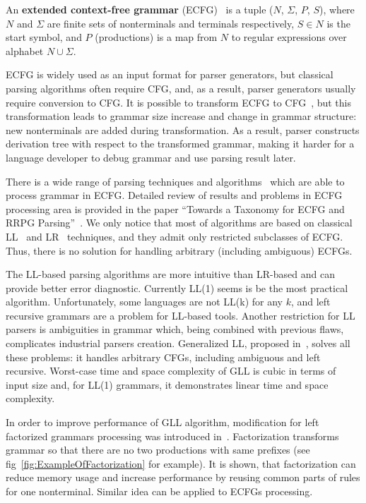 \documentclass[runningheads,a4paper]{llncs}
\begin{document}
\begin{mydef}
An \textbf{extended context-free grammar} (ECFG)~\cite{ECFG} is a tuple ($N$, $\Sigma$, $P$, $S$), where $N$
and $\Sigma$ are finite sets of nonterminals and terminals respectively, $ S\in N$ is the start symbol,
and $P$ (productions) is a map from $N$ to regular expressions over alphabet $N \cup \Sigma$.
\end{mydef}

ECFG is widely used as an input format for parser generators, but classical parsing algorithms often require CFG, and, as a result, parser generators usually require conversion to CFG.
It is possible to transform ECFG to CFG~\cite{ELL}, but this transformation leads to grammar size 
increase and change in grammar structure: new nonterminals are added during transformation.
As a result, parser constructs derivation tree with respect to the transformed grammar, making it harder for a language developer to debug grammar and use parsing result later.

There is a wide range of parsing techniques and algorithms~\cite{AttributedELL,ELRR,ECFGparsing,ELLParser,ELL,ECFG,ELALR,ELRParsing} which are able to process grammar in ECFG.
Detailed review of results and problems in ECFG processing area is provided in the paper ``Towards a Taxonomy for ECFG and RRPG Parsing''~\cite{ECFG}. 
We only notice that most of algorithms are based on classical LL~\cite{ELLParser,AttributedELL,PredictiveECFG} and LR~\cite{ELRParsing,ELALR,ELRR} techniques, and they admit only restricted subclasses of ECFG.
Thus, there is no solution for handling arbitrary (including ambiguous) ECFGs.

The LL-based parsing algorithms are more intuitive than LR-based and can provide better error diagnostic.
Currently LL(1) seems is be the most practical algorithm.
Unfortunately, some languages are not LL(k) for any $k$, and left recursive grammars are a problem for LL-based tools.
Another restriction for LL parsers is ambiguities in grammar which, being combined with previous flaws, complicates industrial parsers creation.
Generalized LL, proposed in~\cite{scott2010gll}, solves all these problems: it handles arbitrary CFGs, including ambiguous and left recursive.  
Worst-case time and space complexity of GLL is cubic in terms of input size and, for LL(1) grammars, it demonstrates linear time and space complexity.

In order to improve performance of GLL algorithm, modification for left factorized grammars processing was introduced in~\cite{scott2016structuring}.
Factorization transforms grammar so that there are no two productions with same prefixes (see fig~\ref{fig:ExampleOfFactorization} for example).
It is shown, that factorization can reduce memory usage and increase performance by reusing common parts of rules for one nonterminal.
Similar idea can be applied to ECFGs processing.
\end{document}

